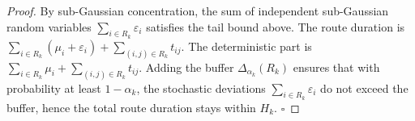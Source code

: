 \documentclass[10pt,a4paper]{amsart}
\begin{document}
\begin{proof}
    By sub-Gaussian concentration, the sum of independent sub-Gaussian random variables $\sum_{i\in R_k}\varepsilon_i$ satisfies the tail bound above. The route duration is $\sum_{i\in R_k}(\mu_i+\varepsilon_i) + \sum_{(i,j)\in R_k} t_{ij}$. The deterministic part is $\sum_{i\in R_k}\mu_i + \sum_{(i,j)\in R_k} t_{ij}$. Adding the buffer $\Delta_{\alpha_k}(R_k)$ ensures that with probability at least $1-\alpha_k$, the stochastic deviations $\sum_{i\in R_k}\varepsilon_i$ do not exceed the buffer, hence the total route duration stays within $H_k$. \hfill$\square$
\end{proof}
\end{document}
